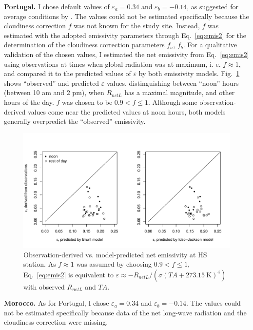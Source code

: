 \documentclass{scrreprt}
\begin{document}
\noindent
\textbf{Portugal.}
I chose default values of $\varepsilon_a = 0.34$ and $\varepsilon_b = -0.14$, as suggested for average conditions by \citet{maidment93}.
The values could not be estimated specifically because the cloudiness correction $f$ was not known for the study site.
Instead, $f$ was estimated with the adopted emissivity parameters through Eq.~\eqref{eq:emis2} for the determination of the cloudiness correction parameters $f_a$, $f_b$.
For a qualitative validation of the chosen values, I estimated the net emissivity from Eq.~\eqref{eq:emis2} using observations at times when global radiation was at maximum, i. e. $f \approx 1$, and compared it to the predicted values of $\varepsilon$ by both emissivity models.
Fig.~\ref{fig:portugal_emis_both} shows ``observed'' and predicted $\varepsilon$ values, distinguishing between ``noon'' hours (between 10 am and 2 pm), when $R_{netL}$ has a maximal magnitude, and other hours of the day.
$f$ was chosen to be $0.9 < f \leq 1$.
Although some observation-derived values come near the predicted values at noon hours, both models generally overpredict the ``observed'' emissivity.

\begin{figure}[ht]
  \centering
  \includegraphics[width=0.8\hsize]{./plot_emis_both_HS.pdf}
  \caption{Observation-derived vs. model-predicted net emissivity at HS station.
           As $f \approx 1$ was assumed by choosing $0.9 < f \leq 1$, Eq.~\eqref{eq:emis2} is equivalent to $\varepsilon \approx - R_{netL} / (\sigma (TA + 273.15~\text{K})^4)$ with observed $R_{netL}$ and $TA$.}
  \label{fig:portugal_emis_both}
\end{figure}

\noindent
\textbf{Morocco.}
As for Portugal, I chose $\varepsilon_a = 0.34$ and $\varepsilon_b = -0.14$.
The values could not be estimated specifically because data of the net long-wave radiation and the cloudiness correction were missing.
\end{document}
